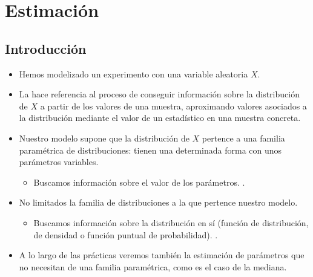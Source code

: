 \section{Estimación}
\subsection{Introducción}
\begin{itemize}[label=\textbullet]
    \item Hemos modelizado un experimento con una variable aleatoria $X$.
    \item La  hace referencia al proceso de conseguir información sobre la distribución de $X$ a partir de los valores de una muestra, aproximando valores asociados a la distribución mediante el valor de un estadístico en una muestra concreta.
\end{itemize}
\begin{tcolorbox}[colback=red!5!white, colframe=red!75!black, title=\textbf{Dos situaciones}]
\begin{itemize}[label=\textbullet]
    \item Nuestro modelo supone que la distribución de $X$ pertence a una familia paramétrica de distribuciones: tienen una determinada forma con unos parámetros variables.
        \begin{itemize}[label=\textrightarrow]
            \item Buscamos información sobre el valor de los parámetros. . 
        \end{itemize}
    \item No limitados la familia de distribuciones a la que pertence nuestro modelo.
        \begin{itemize}[label=\textrightarrow]
            \item Buscamos información sobre la distribución en sí (función de distribución, de densidad o función puntual de probabilidad). .
        \end{itemize}
    \item A lo largo de las prácticas veremos también la estimación de parámetros que no necesitan de una familia paramétrica, como es el caso de la mediana.
\end{itemize}
\end{tcolorbox}
